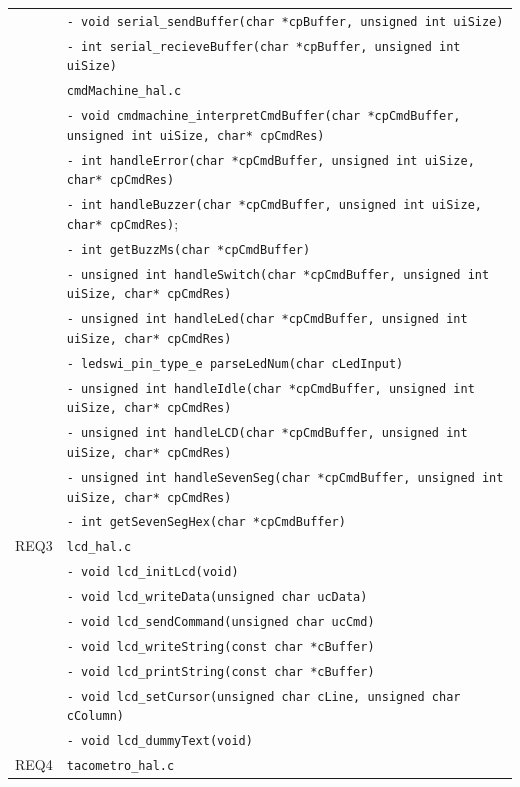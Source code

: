 \documentclass{article}
\begin{document}
\begin{table}[H]
{\begin{tabular}{|c|l|}
						& \texttt{- void serial\_sendBuffer(char *cpBuffer, unsigned int uiSize)}\\
						& \texttt{- int serial\_recieveBuffer(char *cpBuffer, unsigned int uiSize)}\\
						& \texttt{cmdMachine\_hal.c}\\
						& \texttt{- void cmdmachine\_interpretCmdBuffer(char *cpCmdBuffer, unsigned int uiSize, char* cpCmdRes)}\\
						& \texttt{- int handleError(char *cpCmdBuffer, unsigned int uiSize, char* cpCmdRes)}\\
						& \texttt{- int handleBuzzer(char *cpCmdBuffer, unsigned int uiSize, char* cpCmdRes)};\\
						& \texttt{- int getBuzzMs(char *cpCmdBuffer)}\\
						& \texttt{- unsigned int handleSwitch(char *cpCmdBuffer, unsigned int uiSize, char* cpCmdRes)}\\
						& \texttt{- unsigned int handleLed(char *cpCmdBuffer, unsigned int uiSize, char* cpCmdRes)}\\
						& \texttt{- ledswi\_pin\_type\_e parseLedNum(char cLedInput)}\\
						& \texttt{- unsigned int handleIdle(char *cpCmdBuffer, unsigned int uiSize, char* cpCmdRes)}\\
						& \texttt{- unsigned int handleLCD(char *cpCmdBuffer, unsigned int uiSize, char* cpCmdRes)}\\
						& \texttt{- unsigned int handleSevenSeg(char *cpCmdBuffer, unsigned int uiSize, char* cpCmdRes)}\\
						& \texttt{- int getSevenSegHex(char *cpCmdBuffer)}\\
		\hline REQ3 	& \texttt{lcd\_hal.c}\\ 
						& \texttt{- void lcd\_initLcd(void)}\\
						& \texttt{- void lcd\_writeData(unsigned char ucData)}\\
						& \texttt{- void lcd\_sendCommand(unsigned char ucCmd)}\\
						& \texttt{- void lcd\_writeString(const char *cBuffer)}\\
						& \texttt{- void lcd\_printString(const char *cBuffer)}\\
						& \texttt{- void lcd\_setCursor(unsigned char cLine, unsigned char cColumn)}\\
						& \texttt{- void lcd\_dummyText(void)}\\
		\hline REQ4
						& \texttt{tacometro\_hal.c}\\

\end{tabular}}
\end{table}
\end{document}
